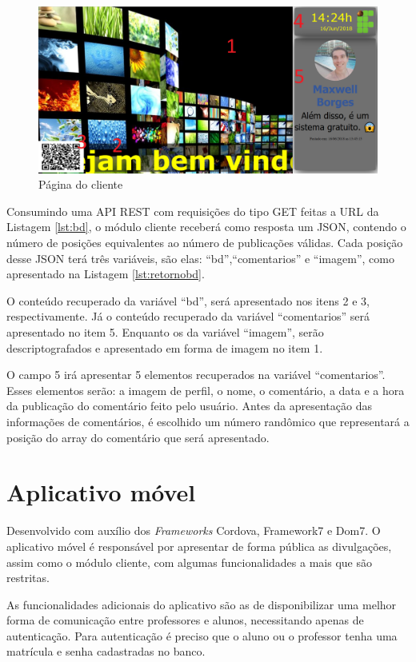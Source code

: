 \begin{figure}[H]
\centering
\includegraphics[scale=0.3]{figuras/cliente1}
\caption{Página do cliente}
\label{fig:cliente1}
\end{figure}

Consumindo uma API REST com requisições do tipo GET feitas a URL da Listagem \ref{lst:bd}, o módulo cliente receberá como resposta um JSON, contendo o número de posições equivalentes ao número de publicações válidas. Cada posição desse JSON terá três variáveis, são elas: ``bd'',``comentarios'' e ``imagem'', como apresentado na Listagem \ref{lst:retornobd}. 

O conteúdo recuperado da variável ``bd'', será apresentado nos itens 2 e 3, respectivamente. Já o conteúdo recuperado da variável ``comentarios'' será apresentado no item 5. Enquanto os da variável ``imagem'', serão descriptografados e apresentado em forma de imagem no item 1.

O campo 5 irá apresentar 5 elementos recuperados na variável ``comentarios''. Esses elementos serão: a imagem de perfil, o nome, o comentário, a data e a hora da publicação do comentário feito pelo usuário. Antes da apresentação das informações de comentários, é escolhido um número randômico que representará a posição do array do comentário que será apresentado.

\section{Aplicativo móvel}
\label{sub:mobile}
Desenvolvido com auxílio dos \textit{Frameworks} Cordova, Framework7 e Dom7. O aplicativo móvel é responsável por apresentar de forma pública as divulgações, assim como o módulo cliente, com algumas funcionalidades a mais que são restritas.

As funcionalidades adicionais do aplicativo são as de disponibilizar uma melhor forma de comunicação entre professores e alunos, necessitando apenas de autenticação. Para autenticação é preciso que o aluno ou o professor tenha uma matrícula e senha cadastradas no banco.

